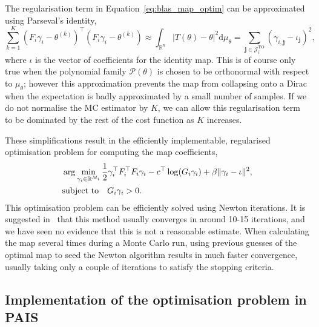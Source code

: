 \documentclass[final]{siamltex}
\begin{document}
The regularisation term in Equation~\eqref{eq:blas_map_optim} can be approximated using Parseval's identity,
\[
	\sum\limits_{k=1}^K \! (F_i\gamma_i-\theta^{(k)})^\top(F_i\gamma_i-\theta^{(k)}) \approx
		\int_{\mathbb{R}^n} |T(\theta)-\theta|^2 \text{d}\mu_\theta =
		\sum\limits_{\mathbf{j}\in\mathcal{J}_i^\text{TO}} (\gamma_{i,\mathbf{j}}-\iota_\mathbf{j})^2,
\]
where $\iota$ is the vector of coefficients for the identity map. This is of course only true when
the polynomial family $\mathcal{P}(\theta)$ is chosen to be orthonormal with respect to $\mu_\theta$; however this
approximation prevents the map from collapsing onto a Dirac when the expectation is badly approximated by a small number of samples. If we do not normalise the MC estimator by $K$, we can allow this regularisation term to be dominated by the rest of the cost function as $K$ increases.

These simplifications result in the efficiently implementable, regularised optimisation problem for
computing the map coefficients,
\begin{align}\label{eq:final_map_optim}
	&\arg\min_{\gamma_i\in\mathbb{R}^{M_i}} \frac{1}{2}\gamma_i^\top F_i^\top F_i\gamma_i -
		c^\top\log(G_i\gamma_i) + \beta\|\gamma_i-\iota\|^2, \\
	&\text{subject to} \quad G_i\gamma_i > 0. \notag
\end{align}
This optimisation problem can be efficiently solved using Newton iterations. It is suggested
in~\cite{parno2014transport} that this method usually converges in around 10-15 iterations, and we
have seen no evidence that this is not a reasonable estimate. When calculating the map several times
during a Monte Carlo run, using previous guesses of the optimal map to seed the Newton algorithm
results in much faster convergence, usually taking only a couple of iterations to satisfy the stopping
criteria.

\subsection{Implementation of the optimisation problem in PAIS}
\end{document}

